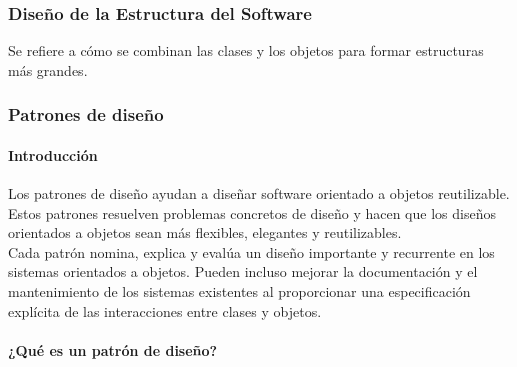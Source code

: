 \subsubsection{Diseño de la Estructura del Software}
Se refiere a cómo se combinan las clases y los objetos para formar estructuras más grandes.
\subsubsection{Patrones de diseño}
\paragraph{Introducción}
Los patrones de diseño ayudan a diseñar software orientado a objetos reutilizable. Estos patrones resuelven problemas concretos de diseño y hacen que los diseños orientados a objetos sean más flexibles, elegantes y reutilizables.\\
Cada patrón nomina, explica y evalúa un diseño importante y recurrente en los sistemas orientados a objetos. Pueden incluso mejorar la documentación y el mantenimiento de los sistemas existentes al proporcionar una especificación explícita de las interacciones entre clases y objetos.
\paragraph{¿Qué es un patrón de diseño?}
